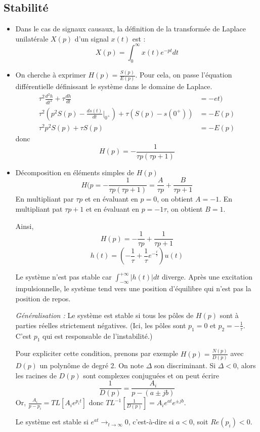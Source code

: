 \documentclass[../../Cours_M1.tex]{subfiles}
\begin{document}
\subsection*{Stabilité}
\begin{itemize}
\item Dans le cas de signaux causaux, la définition de la transformée de Laplace unilatérale $X(p)$ d'un signal $x(t)$ est :
\[ X(p) = \int_0^{\infty} x(t) e^{-pt} dt \]

\item On cherche à exprimer $H(p) = \frac{S(p)}{E(p)}$. Pour cela, on passe l'équation différentielle définissant le système dans le domaine de Laplace.
\begin{align*}
\tau^2 \frac{d^2h}{dt^2} + \tau \frac{dh}{dt} & = -et) \\
\tau^2 (p^2 S(p) - \frac{ds(t)}{dt} |_{0^+}) + \tau (S(p)-s(0^+)) & = - E(p) \\
\tau^2 p^2 S(p) + \tau S(p) & = - E(p)
\end{align*}
donc \[ H(p) = -\frac{1}{\tau p (\tau p +1)} \]

\item Décomposition en éléments simples de $H(p)$
\[ H(p = - \frac{1}{\tau p (\tau p +1)} = \frac{A}{\tau p} + \frac{B}{\tau p + 1} \]
En multipliant par $\tau p$ et en évaluant en $p = 0$, on obtient $A = -1$.
En multipliant pat $\tau p +1$ et en évaluant en $p=-1\tau$, on obtient $B = 1$.

Ainsi, \[ H(p) = -\frac{1}{\tau p} + \frac{1}{\tau p + 1} \]
\[ h(t) = (-\frac{1}{\tau} + \frac{1}{\tau}e^{-\frac{t}{\tau}})u(t) \]

Le système n'est pas stable car $\int_{-\infty}^{+\infty} |h(t)|dt$ diverge. Après une excitation impulsionnelle, le système tend vers une position d'équilibre qui n'est pas la position de repos.

\textit{Généralisation :} Le système est stable si tous les pôles de $H(p)$ sont à parties réelles strictement négatives. (Ici, les pôles sont $p_1 = 0$ et $p_2 = - \frac{1}{\tau}$. C'est $p_1$ qui est responsable de l'instabilité.)

Pour expliciter cette condition, prenons par exemple $H(p) = \frac{N(p)}{D(p)}$ avec $D(p)$ un polynôme de degré 2. On note $\Delta$ son discriminant.
Si $\Delta < 0$, alors les racines de $D(p)$ sont complexes conjuguées et on peut écrire \[\frac{1}{D(p)} = \frac{A_i}{p-(a \pm jb)}\]
Or, $\frac{A_i}{p-p_i} = TL[A_i e^{p_it}]$ donc $TL^{-1}[\frac{1}{D(p)}] = A_ie^{at}e^{\pm jb}$.

Le système est stable si $e^{at} \rightarrow_{t\rightarrow \infty} 0$, c'est-à-dire si $a < 0$, soit $Re(p_i) < 0$.
\end{itemize}
\end{document}
